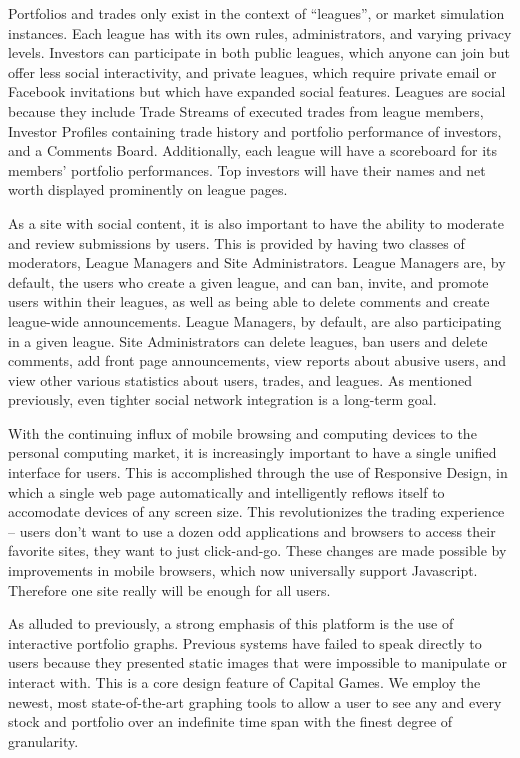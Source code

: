 Portfolios and trades only exist in the context of “leagues”, or market simulation instances. Each league has with its own rules, administrators, and varying privacy levels. Investors can participate in both public leagues, which anyone can join but offer less social interactivity, and private leagues, which require private email or Facebook invitations but which have expanded social features. Leagues are social because they include Trade Streams of executed trades from league members, Investor Profiles containing trade history and portfolio performance of investors, and a Comments Board. Additionally, each league will have a scoreboard for its members’ portfolio performances. Top investors will have their names and net worth displayed prominently on league pages. 

As a site with social content, it is also important to have the ability to moderate and review submissions by users. This is provided by having two classes of moderators, League Managers and Site Administrators. League Managers are, by default, the users who create a given league, and can ban, invite, and promote users within their leagues, as well as being able to delete comments and create league-wide announcements. League Managers, by default, are also participating in a given league. Site Administrators can delete leagues, ban users and delete comments, add front page announcements, view reports about abusive users, and view other various statistics about users, trades, and leagues. As mentioned previously, even tighter social network integration is a long-term goal.

With the continuing influx of mobile browsing and computing devices to the personal computing market, it is increasingly important to have a single unified interface for users. This is accomplished through the use of Responsive Design, in which a single web page automatically and intelligently reflows itself to accomodate devices of any screen size. This revolutionizes the trading experience -- users don't want to use a dozen odd applications and browsers to access their favorite sites, they want to just click-and-go. These changes are made possible by improvements in mobile browsers, which now universally support Javascript. Therefore one site really will be enough for all users.

As alluded to previously, a strong emphasis of this platform is the use of interactive portfolio graphs. Previous systems have failed to speak directly to users because they presented static images that were impossible to manipulate or interact with. This is a core design feature of Capital Games. We employ the newest, most state-of-the-art graphing tools to allow a user to see any and every stock and portfolio over an indefinite time span with the finest degree of granularity.

